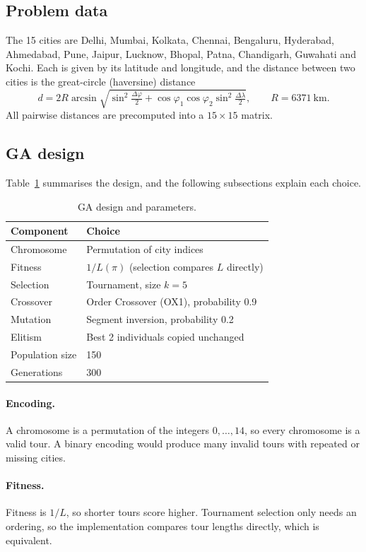 \documentclass[11pt,a4paper]{article}
\begin{document}
\subsection{Problem data}
The 15 cities are Delhi, Mumbai, Kolkata, Chennai, Bengaluru, Hyderabad, Ahmedabad, Pune, Jaipur, Lucknow, Bhopal,
Patna, Chandigarh, Guwahati and Kochi. Each is given by its latitude and longitude, and the distance between two
cities is the great-circle (haversine) distance
\[
  d = 2R\arcsin\sqrt{\sin^2\!\tfrac{\Delta\varphi}{2}+\cos\varphi_1\cos\varphi_2\sin^2\!\tfrac{\Delta\lambda}{2}},
  \qquad R = 6371~\text{km}.
\]
All pairwise distances are precomputed into a $15\times15$ matrix.

\subsection{GA design}
Table~\ref{tab:design} summarises the design, and the following subsections explain each choice.

\begin{table}[H]
\centering
\caption{GA design and parameters.}
\label{tab:design}
\begin{tabular}{@{}ll@{}}
\toprule
Component & Choice \\
\midrule
Chromosome & Permutation of city indices \\
Fitness & $1/L(\pi)$ (selection compares $L$ directly) \\
Selection & Tournament, size $k=5$ \\
Crossover & Order Crossover (OX1), probability 0.9 \\
Mutation & Segment inversion, probability 0.2 \\
Elitism & Best 2 individuals copied unchanged \\
Population size & 150 \\
Generations & 300 \\
\bottomrule
\end{tabular}
\end{table}

\paragraph{Encoding.}
A chromosome is a permutation of the integers $0,\dots,14$, so every chromosome is a valid tour. A binary
encoding would produce many invalid tours with repeated or missing cities.

\paragraph{Fitness.}
Fitness is $1/L$, so shorter tours score higher. Tournament selection only needs an ordering, so the
implementation compares tour lengths directly, which is equivalent.
\end{document}
